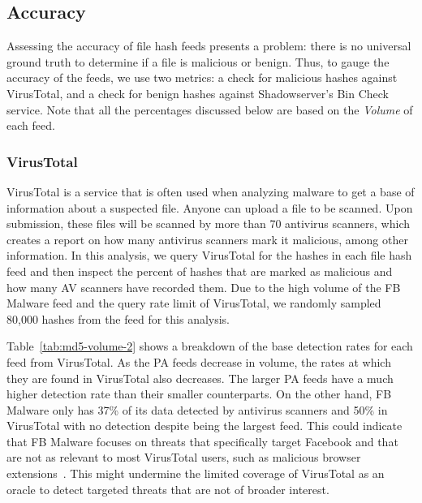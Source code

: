 \subsection{Accuracy}
\label{sec:hash-accuracy}
Assessing the accuracy of file hash feeds presents a problem: there is no
universal ground truth to determine if a file is malicious or benign. Thus,
to gauge the accuracy of the feeds, we use two metrics: a check for malicious
hashes against VirusTotal, and a check for benign hashes against Shadowserver's
Bin Check service. Note that all the percentages discussed below are based on
the \textit{Volume} of each feed.

\subsubsection{VirusTotal}

VirusTotal is a service that is often used when analyzing
malware to get a base of information about a suspected file.
Anyone can upload a file to be scanned. Upon submission, these files will be
scanned by more than 70 antivirus scanners, which creates a report on how many
antivirus scanners mark it malicious, among other information. In this analysis,
we query VirusTotal for the hashes in each file hash feed and then inspect the
percent of hashes that are marked as malicious and how many AV scanners have
recorded them. Due to the high volume of the FB Malware feed and the query
rate limit of VirusTotal, we randomly sampled 80,000 hashes from the feed for
this analysis.

Table~\ref{tab:md5-volume-2} shows a breakdown of the base detection rates 
for
each feed from VirusTotal. As the PA feeds decrease in volume, the rates at
which they are found in VirusTotal also decreases. The larger PA feeds have a
much higher detection rate than their smaller counterparts. On the other hand,
FB Malware only has 37\% of its data detected by antivirus scanners and 50\% in
VirusTotal with no detection despite being the largest feed. This could indicate
that FB Malware focuses on threats that specifically target Facebook and that
are not as relevant to most VirusTotal users, such as malicious browser
extensions~\cite{dekoven2017malicious, jagpal2015trends, kapravelos2014hulk}.
This might undermine the limited coverage of VirusTotal as an oracle to detect
targeted threats that are not of broader interest.

